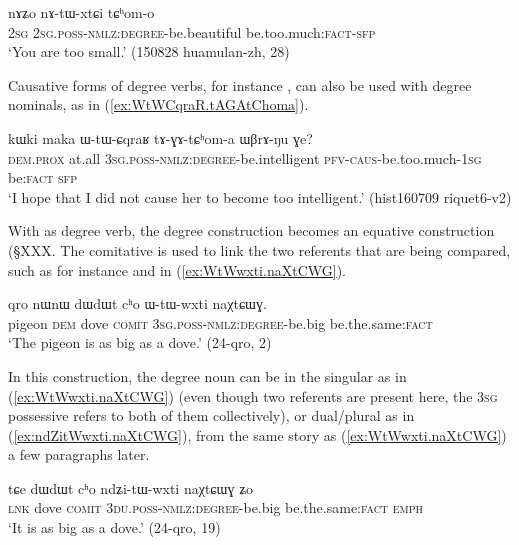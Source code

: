 \begin{exe}
\ex \label{ex:natWxtCi.tChom}
\gll nɤʑo nɤ-tɯ-xtɕi tɕʰom-o \\
\textsc{2sg} \textsc{2sg}.\textsc{poss}-\textsc{nmlz}:\textsc{degree}-be.beautiful be.too.much:\textsc{fact}-\textsc{sfp} \\
\glt `You are too small.' (150828 huamulan-zh, 28)
\end{exe}

Causative forms of degree verbs, for instance , can also be used with degree nominals, as in (\ref{ex:WtWCqraR.tAGAtChoma}).

\begin{exe}
\ex \label{ex:WtWCqraR.tAGAtChoma}
\gll kɯki maka ɯ-tɯ-ɕqraʁ tɤ-ɣɤ-tɕʰom-a ɯβrɤ-ŋu ɣe? \\
\textsc{dem}.\textsc{prox} at.all  \textsc{3sg}.\textsc{poss}-\textsc{nmlz}:\textsc{degree}-be.intelligent \textsc{pfv}-\textsc{caus}-be.too.much-\textsc{1sg} be:\textsc{fact} \textsc{sfp} \\
\glt `I hope that I did not cause her to become too intelligent.' (hist160709 riquet6-v2)
\end{exe}

With  as degree verb, the degree construction becomes an equative construction (§XXX. The comitative  is used to link the two referents that are being compared, such as for instance  and  in (\ref{ex:WtWwxti.naXtCWG}). 

\begin{exe}
\ex \label{ex:WtWwxti.naXtCWG}
\gll  qro nɯnɯ dɯdɯt cʰo ɯ-tɯ-wxti naχtɕɯɣ. \\
pigeon \textsc{dem} dove \textsc{comit} \textsc{3sg}.\textsc{poss}-\textsc{nmlz}:\textsc{degree}-be.big be.the.same:\textsc{fact} \\
\glt `The pigeon is as big as a dove.' (24-qro, 2)
\end{exe}

In this construction, the degree noun can be in the singular as in (\ref{ex:WtWwxti.naXtCWG}) (even though two referents are present here, the \textsc{3sg} possessive  refers to both of them collectively), or dual/plural as in (\ref{ex:ndZitWwxti.naXtCWG}), from the same story as (\ref{ex:WtWwxti.naXtCWG}) a few paragraphs later.

\begin{exe}
\ex \label{ex:ndZitWwxti.naXtCWG}
\gll tɕe  dɯdɯt cʰo ndʑi-tɯ-wxti naχtɕɯɣ ʑo \\
\textsc{lnk} dove \textsc{comit} \textsc{3du}.\textsc{poss}-\textsc{nmlz}:\textsc{degree}-be.big be.the.same:\textsc{fact} \textsc{emph} \\
\glt `It is as big as a dove.' (24-qro, 19)
\end{exe}

